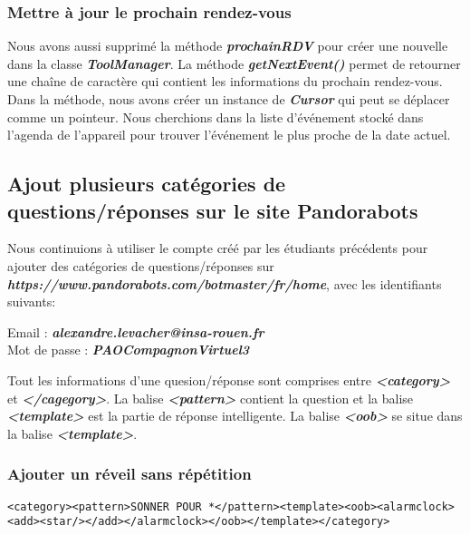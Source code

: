 \subsubsection*{Mettre à jour le prochain rendez-vous}

\indent Nous avons aussi supprimé la méthode \textbf{\emph{prochainRDV}} pour créer une nouvelle dans la classe \textbf{\emph{ToolManager}}. La méthode \textbf{\emph{getNextEvent()}} permet de retourner une chaîne de caractère qui contient les informations du prochain rendez-vous. Dans la méthode, nous avons créer un instance de \textbf{\emph{Cursor}} qui peut se déplacer comme un pointeur. Nous cherchions dans la liste d'événement stocké dans l'agenda de l'appareil pour trouver l'événement le plus proche de la date actuel.

\subsection{Ajout plusieurs catégories de questions/réponses sur le site Pandorabots}

\indent Nous continuions à utiliser le compte créé par les étudiants précédents pour ajouter des catégories de questions/réponses sur \textbf{\emph{https://www.pandorabots.com/botmaster/fr/home}}, avec les identifiants suivants:

\begin{center}
	Email : \textbf{\emph{alexandre.levacher@insa-rouen.fr}}\\
	Mot de passe : \textbf{\emph{PAOCompagnonVirtuel3}}
\end{center}

\indent Tout les informations d'une quesion/réponse sont comprises entre \textbf{\emph{<category>}} et \textbf{\emph{</cagegory>}}. La balise \textbf{\emph{<pattern>}} contient la question et la balise \textbf{\emph{<template>}} est la partie de réponse intelligente. La balise \textbf{\emph{<oob>}} se situe dans la balise \textbf{\emph{<template>}}.

\subsubsection{Ajouter un réveil sans répétition}
\begin{lstlisting}[frame=none,aboveskip=0.5em]
<category><pattern>SONNER POUR *</pattern><template><oob><alarmclock>
<add><star/></add></alarmclock></oob></template></category>
\end{lstlisting}

